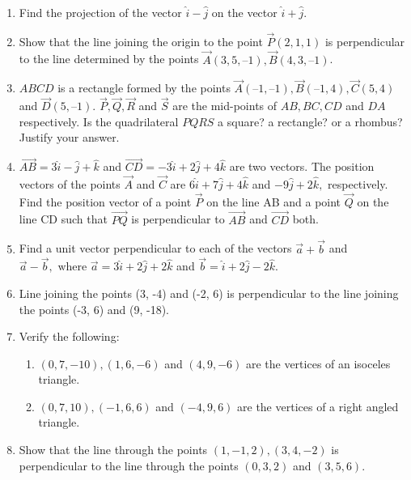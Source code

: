 \begin{enumerate}[label=\thesubsection.\arabic*, ref=\thesubsection.\theenumi]
	\\
	\solution
		
\item Find the projection of the vector $\hat{i}-\hat{j}$ on the vector $\hat{i}+\hat{j}$.
	\\
\solution
		
		\item 
 Show that the line joining the origin to the point $\vec{P}(2,  1,  1)$ is perpendicular to the
line determined by the points $\vec{A}(3,  5,  – 1),  \vec{B}(4,  3,  – 1)$.
\\
    \solution
		
\item $ABCD$ is a rectangle formed by the points $\vec{A}(–1,  –1),  \vec{B}(– 1,  4),  \vec{C}(5,  4)$  and  $\vec{D}(5,  – 1)$. $\vec{P},  \vec{Q},  \vec{R}$ and $\vec{S}$ are the mid-points of $AB,  BC,  CD$ and $DA$ respectively. Is the quadrilateral $PQRS$ a square? a rectangle? or a rhombus? Justify your answer.
	\\
	
\item $\overrightarrow{AB}=3\hat{i}-\hat{j}+\hat{k}$ and $\overrightarrow{CD}=-3\hat{i}+2\hat{j}+4\hat{k}$ are two vectors. The position vectors of the points $\vec{A}$ and $\vec{C}$ are $6\hat{i}+7\hat{j}+4\hat{k}$ and $-9\hat{j}+2\hat{k}, $ respectively. Find the position vector of a point $\vec{P}$ on the line AB and a point $\vec{Q}$ on the line CD such that $\overrightarrow{PQ}$ is perpendicular to $\overrightarrow{AB}$ and $\overrightarrow{CD}$ both.
\item Find a unit vector perpendicular to each of the vectors $\overrightarrow{a}+\overrightarrow{b}$ and $\overrightarrow{a}-\overrightarrow{b}, \text{ where } \overrightarrow{a}=3\hat{i}+2\hat{j}+2\hat{k}$ and $ \overrightarrow{b}=\hat{i}+2\hat{j}-2\hat{k}$. 
	\\
		\solution
		
\item Line joining the points (3, -4) and (-2, 6) is perpendicular to the line joining the points (-3, 6) and (9, -18).
\item Verify the following:
\begin{enumerate}
\item $(0, 7, -10),  (1, 6, -6)$ and $(4, 9, -6)$ are the vertices of an isoceles triangle.
\item $(0, 7, 10),  (-1, 6, 6)$ and $(-4, 9, 6)$ are the vertices of a right angled triangle.
\end{enumerate}
\item  Show that the line through the points $(1, -1, 2), (3, 4, -2 )$ is perpendicular to the line through the points $(0, 3, 2)$ and $(3, 5, 6)$.

\end{enumerate}
